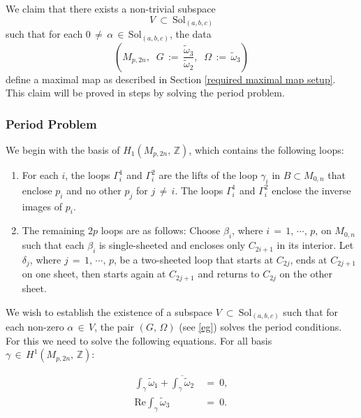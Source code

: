 \documentclass[12pt]{amsart}
\numberwithin{equation}{section}
\begin{document}
We claim that there exists a non-trivial subspace \[V\ \subset\ \text{Sol}_{(a,b,c)}\] such that for each
\(0\, \neq\, \alpha \,\in\, \text{Sol}_{(a,b,c)}\), the data
\begin{equation}\label{eg}
\left(M_{p, 2n}, \;\; G \,:=\, \frac{\widetilde{\omega}_3}{\widetilde{\omega}_2}, \;\; \Omega
\,:=\, \widetilde{\omega}_3\right)
\end{equation}
define a maximal map as described in Section \ref{required maximal map setup}. This 
claim will be proved in steps by solving the period problem.

\subsubsection{Period Problem}\label{subsub:Period}

We begin with the basis of \(H_1(M_{p,2n},\, \mathbb{Z})\), which contains the following loops:

\begin{enumerate}
\item For each \(i\), the loops \(\Gamma_i^{1}\) and \(\Gamma_i^{2}\) are the lifts of the loop \(\gamma_i\)
in \(B \subset M_{0,n}\) that enclose \(p_i\) and no other \(p_j\) for \(j \,\neq\, i\). The loops
\(\Gamma_i^{1}\) and \(\Gamma_i^{2}\) enclose the inverse images of \(p_i\). 

\item The remaining \(2p\) loops are as follows: Choose \(\beta_i\), where \(i\, =\, 1,\, \cdots, \,p\), on 
\(M_{0,n}\) such that each \(\beta_i\) is single-sheeted and encloses only \(C_{2i+1}\) in its interior. Let 
\(\delta_j\), where \(j\,=\,1,\,\cdots,\, p\), be a two-sheeted loop that starts at \(C_{2j}\), ends at
\(C_{2j+1}\) on  one sheet, then starts again at \(C_{2j+1}\) and returns to \(C_{2j}\) on the other sheet.
\end{enumerate} 

We wish to establish the existence of a subspace \(V\ \subset\ \text{Sol}_{(a,b,c)}\) such that for each non-zero
\(\alpha \,\in\, V\), the pair \((G,\, \Omega)\) (see \eqref{eg}) solves the period conditions. For this we need
to solve the following equations. For all basis \(\gamma\,\in\, H^1(M_{p,2n},\,\mathbb Z)\):

\begin{align}
\int_\gamma \widetilde{\omega}_1 + \overline{\int_\gamma \widetilde{\omega}_2} &\ =\ 0, \\
\text{Re} \int_\gamma \widetilde{\omega}_3 &\ =\ 0.
\end{align}
\end{document}
